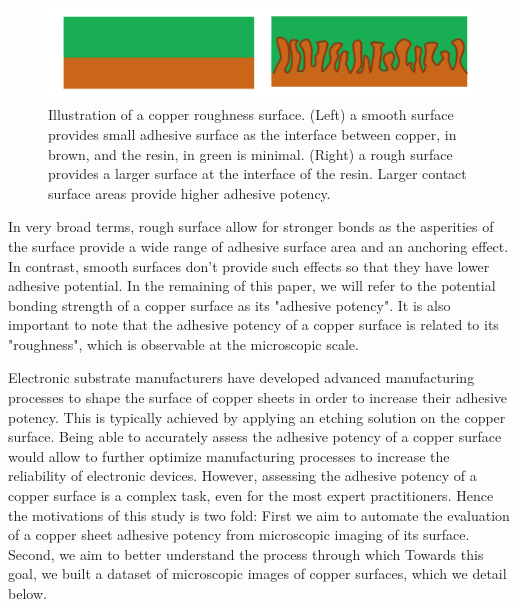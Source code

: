 \documentclass[10pt,twocolumn,letterpaper]{article}
\begin{document}
\begin{figure}[h]
	\centering
	\includegraphics[width=0.9\linewidth]{"./figures/Figure2"}
	\caption{
		Illustration of a copper roughness surface. (Left) a smooth surface provides small adhesive surface as the interface between copper, in brown, and the resin, in green is minimal. (Right) a rough surface provides a larger surface at the interface of the resin. Larger contact surface areas provide higher adhesive potency.
	}
\end{figure}

In very broad terms, rough surface allow for stronger bonds 
as the asperities of the surface provide a wide range of adhesive surface area and an anchoring effect. 
In contrast, smooth surfaces don’t provide such effects so that they have lower adhesive potential. 
In the remaining of this paper, we will refer to the potential bonding strength of a copper surface as its "adhesive potency".
It is also important to note that the adhesive potency of a copper surface is related to its "roughness", 
which is observable at the microscopic scale.

Electronic substrate manufacturers have developed advanced manufacturing processes to shape the surface of copper sheets in order to increase their adhesive potency. 
This is typically achieved by applying an etching solution on the copper surface.
Being able to accurately assess the adhesive potency of a copper surface would 
allow to further optimize manufacturing processes to increase the reliability of electronic devices.
However, assessing the adhesive potency of a copper surface is a complex task, even for the most expert practitioners. 
Hence the motivations of this study is two fold: 
First we aim to automate the evaluation of a copper sheet adhesive potency from microscopic imaging of its surface. 
Second, we aim to better understand the process through which  
Towards this goal, we built a dataset of microscopic images of copper surfaces, which we detail below.
\end{document}
